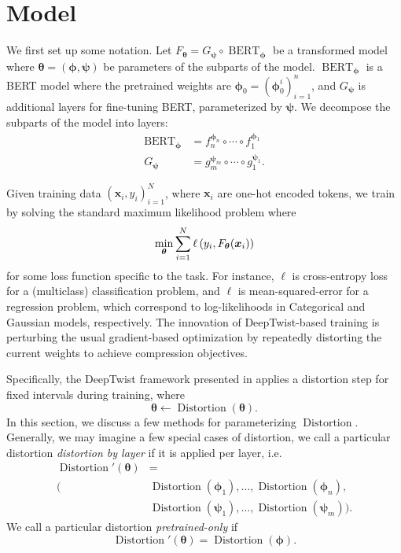 \documentclass[10pt]{article}
\newcommand{\bert}{\operatorname{BERT}}
\newcommand{\distortion}{\operatorname{Distortion}}
\newcommand{\btheta}{{\bm{\theta}}}
\newcommand{\bphi}{{\bm{\phi}}}
\newcommand{\bpsi}{{\bm{\psi}}}
\begin{document}
\section{Model}
\label{sec:model}

We first set up some notation. Let $F_\btheta = G_\bpsi \circ \bert_\bphi$ be
a transformed model where $\btheta = (\bphi, \bpsi)$ be parameters of the
subparts of the model. $\bert_\bphi$ is a BERT model where the pretrained
weights are $\bphi_0 = (\bphi_0^i)_{i=1}^n$, and $G_\bpsi$ is additional
layers for fine-tuning BERT, parameterized by $\bpsi$. We decompose the
subparts of the model into layers: \begin{align*}
\bert_\bphi &= f_{n}^{\bphi_n} \circ \cdots \circ f_1^{\bphi_1} \\
G_\bpsi &= g_{m}^{\bpsi_m} \circ \cdots \circ g_1^{\bpsi_1}.
\end{align*}



Given training data $(\bm x_i, y_i)_{i=1}^N$, where $\bm x_i$ are one-hot
encoded tokens, we train by solving the standard maximum likelihood problem
where \[
\min_{\btheta} \sum_{i=1}^N \ell\pr{y_i, F_\btheta(\bm x_i)}
\]
for some loss function specific to the task. For instance, $\ell$ is
cross-entropy loss for a (multiclass) classification problem, and $\ell$ is
mean-squared-error for a regression problem, which correspond to
log-likelihoods in Categorical and Gaussian models, respectively. The
innovation of DeepTwist-based training is perturbing the usual gradient-based
optimization by repeatedly distorting the current weights to achieve
compression objectives.

Specifically, the DeepTwist framework presented in  applies
a distortion step for fixed intervals during training, where \[
\btheta \gets \distortion(\btheta). 
\]
In this section, we discuss a few methods for parameterizing $\distortion$.
Generally, we may imagine a few special cases of distortion, we call a
particular distortion \emph{distortion by layer} if it is applied per layer,
i.e. \begin{align*}
\distortion'(\btheta) &= \\
(&\distortion(\bphi_1),\ldots,\distortion(\bphi_n),\\
&\distortion(\bpsi_1),\ldots, \distortion(\bpsi_m)).
\end{align*}
We call a particular distortion \emph{pretrained-only} if \[
\distortion'(\btheta) = \distortion(\bphi).
\]
\end{document}
